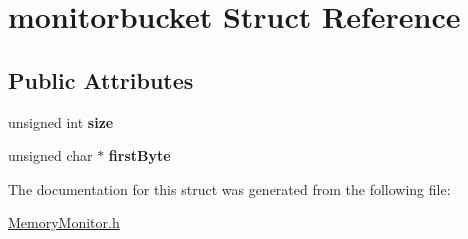 \hypertarget{structmonitorbucket}{\section{monitorbucket \-Struct \-Reference}
\label{structmonitorbucket}
}
\subsection*{\-Public \-Attributes}
\begin{DoxyCompactItemize}
\item 
\hypertarget{structmonitorbucket_adbeb5d62c4449e3db54c8de743bee2bc}{unsigned int {\bfseries size}}\label{structmonitorbucket_adbeb5d62c4449e3db54c8de743bee2bc}

\item 
\hypertarget{structmonitorbucket_a680553e4dc358c300edcd99279928a54}{unsigned char $\ast$ {\bfseries first\-Byte}}\label{structmonitorbucket_a680553e4dc358c300edcd99279928a54}

\end{DoxyCompactItemize}


\-The documentation for this struct was generated from the following file\-:\begin{DoxyCompactItemize}
\item 
\hyperlink{MemoryMonitor_8h}{\-Memory\-Monitor.\-h}\end{DoxyCompactItemize}
